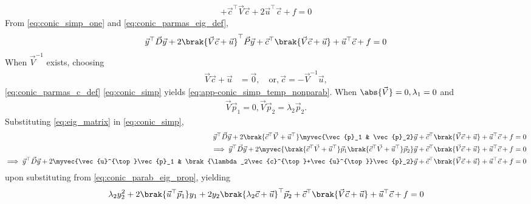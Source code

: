 \documentclass{article}
\numberwithin{equation}{section}
\numberwithin{figure}{section}
\begin{document}
\begin{enumerate}[label=\thesubsection.\arabic*.,ref=\thesubsection.\theenumi]
\begin{align}
+  \vec{c}^{\top}\vec{V}\vec{c} + 2\vec{u}^{\top}\vec{c} + f= 0
\label{eq:conic_simp_one}
\end{align}
%
From \eqref{eq:conic_simp_one} and \eqref{eq:conic_parmas_eig_def},
\begin{align}
\vec{y}^{\top}\vec{D}\vec{y}+2\brak{\vec{V}\vec{c}+\vec{u}}^{\top}\vec{P}\vec{y}
+  \vec{c}^{\top}\brak{\vec{V}\vec{c} + \vec{u}}+ \vec{u}^{\top}\vec{c} + f= 0
\label{eq:conic_simp}
\end{align}
When $\vec{V}^{-1}$ exists, choosing
\begin{align}
\vec{V}\vec{c}+\vec{u} &= \vec{0}, \quad \text{or}, \vec{c} = -\vec{V}^{-1}\vec{u},
\label{eq:conic_parmas_c_def}
\end{align}
%
 \eqref{eq:conic_parmas_c_def}
 \eqref{eq:conic_simp}
yields \eqref{eq:app-conic_simp_temp_nonparab}. 
When $\abs{\vec{V}} = 0, \lambda_1 = 0$ and 
\begin{align}
\vec{V}\vec{p}_1 = 0, 
\vec{V}\vec{p}_2 = \lambda_2\vec{p}_2.
\label{eq:conic_parab_eig_prop} 
\end{align}
Substituting \eqref{eq:eig_matrix}
in \eqref{eq:conic_simp},
\begin{align*}
	\vec{y}^{\top}\vec{D}\vec{y}+2\brak{\vec{c}^{\top}\vec{V}+\vec{u}^{\top}}\myvec{\vec{p}_1 & \vec{p}_2}\vec{y}
	+  \vec{c}^{\top}\brak{\vec{V}\vec{c} + \vec{u}}+ \vec{u}^{\top}\vec{c} + f= 0
\\
	\implies \vec{y}^{\top}\vec{D}\vec{y}
	+2\myvec{\brak{\vec{c}^{\top}\vec{V}+\vec{u}^{\top}}\vec{p}_1  \brak{\vec{c}^{\top}\vec{V}+\vec{u}^{\top}}\vec{p}_2}\vec{y}
	+  \vec{c}^{\top}\brak{\vec{V}\vec{c} + \vec{u}}+ \vec{u}^{\top}\vec{c} + f= 0
\\
	\implies \vec{y}^{\top}\vec{D}\vec{y}
	+2\myvec{\vec{u}^{\top}\vec{p}_1 & \brak{\lambda_2\vec{c}^{\top}+\vec{u}^{\top}}\vec{p}_2}\vec{y}
	+  \vec{c}^{\top}\brak{\vec{V}\vec{c} + \vec{u}}+ \vec{u}^{\top}\vec{c} + f= 0
\end{align*}
upon substituting from 
 \eqref{eq:conic_parab_eig_prop}, yielding
\begin{multline}
\lambda_2y_2^2+2\brak{\vec{u}^{\top}\vec{p}_1}y_1+  2y_2\brak{\lambda_2\vec{c}+\vec{u}}^{\top}\vec{p}_2
	+  \vec{c}^{\top}\brak{\vec{V}\vec{c} + \vec{u}}+ \vec{u}^{\top}\vec{c} + f= 0

\end{multline}
\end{enumerate}
\end{document}

